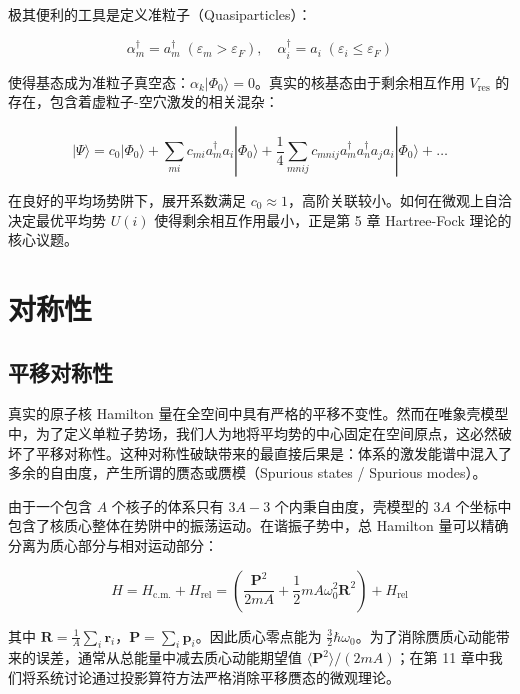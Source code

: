 极其便利的工具是定义准粒子（Quasiparticles）：

\begin{equation}
\alpha^{\dagger}_{m}=a^{\dagger}_{m}\;(\varepsilon_{m}>\varepsilon_{F}),\quad\alpha^{\dagger}_{i}=a_{i}\;(\varepsilon_{i}\leqslant\varepsilon_{F})\label{eq:quasiparticle_particle_hole}
\end{equation}

使得基态成为准粒子真空态：$\alpha_{k}|\Phi_{0}\rangle=0$。真实的核基态由于剩余相互作用 $V_{\text{res}}$
的存在，包含着虚粒子-空穴激发的相关混杂：

\begin{equation}
|\Psi\rangle=c_{0}|\Phi_{0}\rangle+\sum_{mi}c_{mi}a^{\dagger}_{m}a_{i}|\Phi_{0}\rangle+\frac{1}{4}\sum_{mnij}c_{mnij}a^{\dagger}_{m}a^{\dagger}_{n}a_{j}a_{i}|\Phi_{0}\rangle+\dots\label{eq:ground_state_correlation_expansion}
\end{equation}

在良好的平均场势阱下，展开系数满足 $c_{0}\approx1$，高阶关联较小。如何在微观上自洽决定最优平均势 $U(i)$
使得剩余相互作用最小，正是第 5 章 Hartree-Fock 理论的核心议题。

\section{对称性\label{sec:=005BF9=0079F0=006027}}

\subsection{平移对称性}

真实的原子核 Hamilton 量在全空间中具有严格的平移不变性。然而在唯象壳模型中，为了定义单粒子势场，我们人为地将平均势的中心固定在空间原点，这必然破坏了平移对称性。这种对称性破缺带来的最直接后果是：体系的激发能谱中混入了多余的自由度，产生所谓的赝态或赝模（Spurious
states / Spurious modes）。

由于一个包含 $A$ 个核子的体系只有 $3A-3$ 个内秉自由度，壳模型的 $3A$ 个坐标中包含了核质心整体在势阱中的振荡运动。在谐振子势中，总
Hamilton 量可以精确分离为质心部分与相对运动部分：

\begin{equation}
H=H_{\text{c.m.}}+H_{\text{rel}}=\left(\frac{\boldsymbol{P}^{2}}{2mA}+\frac{1}{2}mA\omega^{2}_{0}\boldsymbol{R}^{2}\right)+H_{\text{rel}}\label{eq:trans_cm_separation}
\end{equation}

其中 $\boldsymbol{R}=\frac{1}{A}\sum_{i}\boldsymbol{r}_{i}$，$\boldsymbol{P}=\sum_{i}\boldsymbol{p}_{i}$。因此质心零点能为
$\frac{3}{2}\hbar\omega_{0}$。为了消除赝质心动能带来的误差，通常从总能量中减去质心动能期望值 $\langle\boldsymbol{P}^{2}\rangle/(2mA)$；在第
11 章中我们将系统讨论通过投影算符方法严格消除平移赝态的微观理论。

